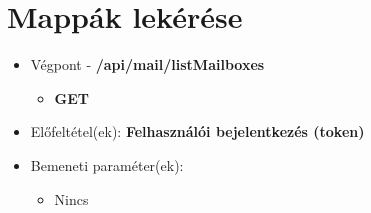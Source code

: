 \section{Mappák lekérése}
\begin{itemize}
    \item Végpont - \textbf{/api/mail/listMailboxes}
    \begin{itemize}
        \item \textbf{GET}
    \end{itemize}
    \item Előfeltétel(ek): \textbf{Felhasználói bejelentkezés (token)}
\end{itemize}
\begin{itemize}
    \item Bemeneti paraméter(ek):
    \begin{itemize}
        \item Nincs
    \end{itemize}
\end{itemize}